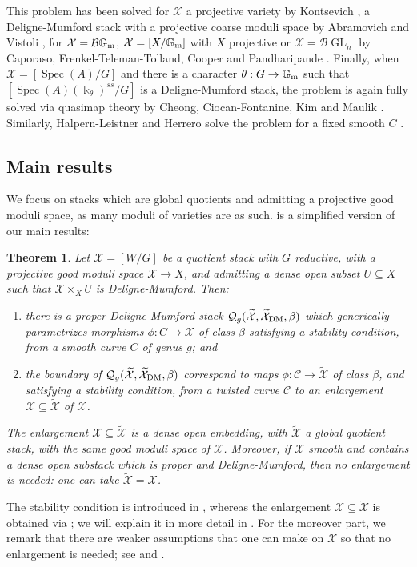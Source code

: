 \documentclass{amsart}
\newcommand{\bG}{\mathbb{G}}
\newcommand{\sC}{\mathscr{C}}
\newcommand{\cB}{\mathcal{B}}
\newcommand{\cQ}{\mathcal{Q}}
\newcommand{\cX}{\mathcal{X}}
\newcommand{\spec}{\operatorname{Spec}}
\newcommand{\Gm}{\bG_{{\rm m}}}
\newcommand{\GL}{\operatorname{GL}}
\newcommand{\dm}{{\rm DM}}
\newtheorem{Teo}[theorem]{Theorem}
\theoremstyle{definition}
\theoremstyle{definition}
\begin{document}
This problem has been solved for $\cX$ a projective variety by Kontsevich \cites{Kon, FP}, a Deligne-Mumford stack with a projective coarse moduli space by Abramovich and Vistoli \cite{AV_compactifying}, for $\cX=\cB \Gm$, $\cX=[X/\Gm]$ with $X$ projective or $\cX=\cB \GL_n$ by Caporaso, Frenkel-Teleman-Tolland, Cooper and Pandharipande \cites{Cap, FTT,cooper2022git, Pand}. Finally, when $\cX=[\spec(A)/G]$ and there is a character $\theta:G\to \Gm$ such that
$[\spec(A)(\Bbbk_\theta)^{ss}/G]$ is a Deligne-Mumford stack, the problem is again fully solved via quasimap theory by Cheong, Ciocan-Fontanine, Kim and Maulik \cites{ciocan2010moduli, ciocan2014stable, orbifold_qmap_theory}. Similarly, Halpern-Leistner and Herrero solve the problem for a fixed smooth $C$ \cite{HLH23}.
\subsection{Main results} We focus on stacks which are global quotients and admitting a projective good moduli space, as many moduli of varieties are as such.  is a simplified version of our main results:\begin{Teo}\label{thm_intro_simplified}
Let $\cX=[W/G]$ be a quotient stack with $G$ reductive, with a projective good moduli space $\cX\to X$, and admitting a dense open subset $U\subseteq X$ such that $\cX\times_XU$ is Deligne-Mumford. Then:
\begin{enumerate}
\item there is a proper Deligne-Mumford stack $\cQ_{g}(\widetilde{\cX},\widetilde{\cX}_\dm,\beta)$ which generically parametrizes morphisms $\phi:C\to \cX$ of class $\beta$ satisfying a stability condition, from a smooth curve $C$ of genus $g$; and
\item the boundary of $\cQ_g(\widetilde{\cX},\widetilde{\cX}_\dm,\beta)$ correspond to maps $\phi:\sC\to \widetilde{\cX}$ of class $\beta$, %
and satisfying a stability condition, from a twisted curve $\sC$ to an enlargement $\cX\subseteq \widetilde{\cX}$ of $\cX$. 
\end{enumerate} 
 The enlargement $\cX\subseteq \widetilde{\cX}$ is a dense open embedding, with $\widetilde{\cX}$ a global quotient stack, with the same good moduli space of $\cX$. Moreover, if $\cX$ smooth and contains a dense open substack which is proper and Deligne-Mumford, then no enlargement is needed: one can take $\widetilde{\cX}=\cX$.
 \end{Teo}
 The stability condition is introduced in , whereas the enlargement $\cX\subseteq \widetilde{\cX}$ is obtained via ; we will explain it in more detail in .
 For the moreover part, we remark that there are weaker assumptions that one can make on $\cX$ so that no enlargement is needed; see  and .
\end{document}
